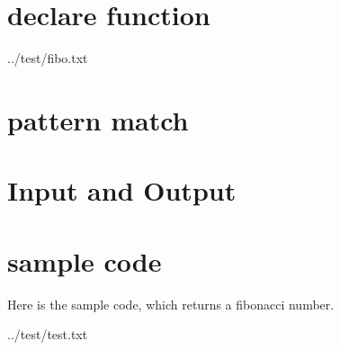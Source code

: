 \documentclass[openany,b5j,11pt,english]{jsbook}
\begin{document}
\section{declare function}

{../test/fibo.txt}
\section{pattern match}
\section{Input and Output}
\section{sample code}
Here is the sample code, which returns a fibonacci number.

{../test/test.txt}
\end{document}
